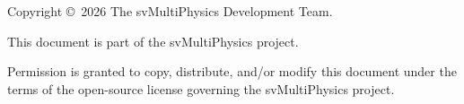 \thispagestyle{empty}
\vspace*{\fill}

\noindent
Copyright \copyright\ 2026 The svMultiPhysics Development Team.

\bigskip\noindent
This document is part of the svMultiPhysics project.

\bigskip\noindent
Permission is granted to copy, distribute, and/or modify this document under
the terms of the open-source license governing the svMultiPhysics project.

\clearpage
